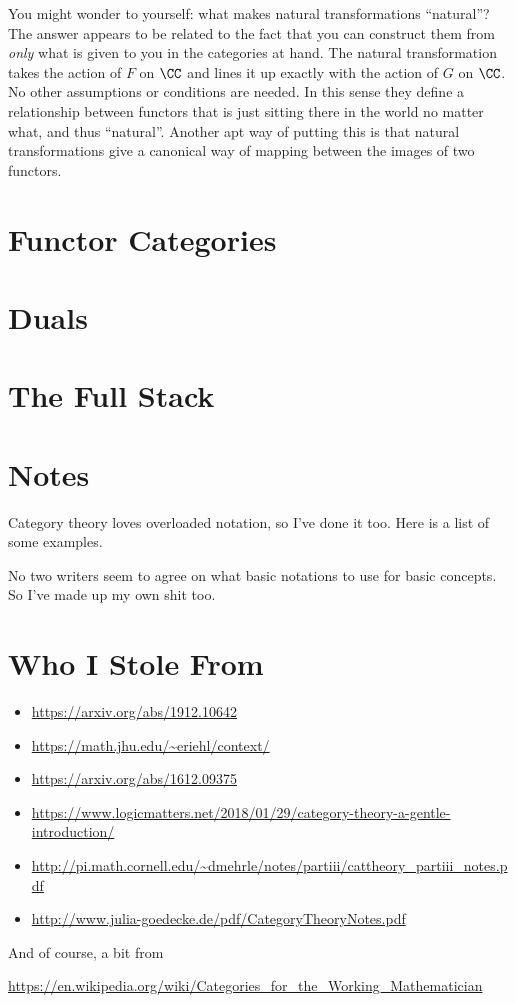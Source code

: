 You might wonder to yourself: what makes natural transformations ``natural''? The answer appears to be related to the fact that you can construct them from {\it only} what is given to you in the categories at hand. The natural transformation takes the action of $F$ on $\CC$ and lines it up exactly with the action of $G$ on $\CC$. No other assumptions or conditions are needed. In this sense they define a relationship between functors that is just sitting there in the world no matter what, and thus ``natural''. Another apt way of putting this is that natural transformations give a canonical way of mapping between the images of two functors.

\section{Functor Categories}

\section{Duals}

\section{The Full Stack}

\section{Notes}

Category theory loves overloaded notation, so I've done it too. Here is a list of some examples.

No two writers seem to agree on what basic notations to use for basic concepts. So I've made up my own shit too.

\section{Who I Stole From}

\small
\begin{itemize}
\item \url{https://arxiv.org/abs/1912.10642}

\item \url{https://math.jhu.edu/~eriehl/context/}

\item \url{https://arxiv.org/abs/1612.09375}

\item \url{https://www.logicmatters.net/2018/01/29/category-theory-a-gentle-introduction/}

\item \url{http://pi.math.cornell.edu/~dmehrle/notes/partiii/cattheory_partiii_notes.pdf}

\item \url{http://www.julia-goedecke.de/pdf/CategoryTheoryNotes.pdf}

\end{itemize}

And of course, a bit from

\url{https://en.wikipedia.org/wiki/Categories_for_the_Working_Mathematician}